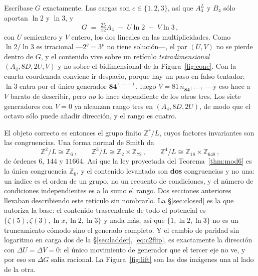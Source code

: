 \documentclass[11pt,a4paper]{article}
\newcommand{\ZZ}{\mathbb{Z}}
\newcommand{\rep}[1]{\mathbf{#1}}
\begin{document}
Escríbase $G$ exactamente. Las cargas son $c\in\{1,2,3\}$, así que $A_4^{L}$ y $B_4$ sólo aportan
$\ln 2$ y $\ln 3$, y
\begin{equation}\label{eq:UV}
  G\;=\;\tfrac{25}{12}A_4\;-\;U\ln 2\;-\;V\ln 3\,,
\end{equation}
con $U$ semientero y $V$ entero, los dos lineales en las multiplicidades. Como $\ln2/\ln3$ es
irracional ---$2^q=3^p$ no tiene solución---, el par $(U,V)$ no se pierde dentro de $G$, y el
contenido vive sobre un retículo \emph{tetradimensional} $(A_4,8D,2U,V)$ y no sobre el bidimensional
de la Figura~\ref{fig:cone}. Con la cuarta coordenada conviene ir despacio, porque hay un paso en
falso tentador: $\ln3$ entra por el único generador $\rep{84}^{(+,-)}$, luego
$V=81\,n_{\rep{84}^{(+,-)}}$ ---y eso hace a $V$ barato de describir, pero \emph{no} lo hace
dependiente de los otros tres. Los siete generadores con $V=0$ ya alcanzan rango tres en
$(A_4,8D,2U)$, de modo que el octavo sólo puede añadir dirección, y el rango es cuatro.

El objeto correcto es entonces el grupo finito $\ZZ^r/L$, cuyos factores invariantes son las
congruencias. Una forma normal de Smith da
\begin{equation}\label{eq:snf}
  \ZZ^2/L\cong\ZZ_6\,,\qquad
  \ZZ^3/L\cong\ZZ_2\times\ZZ_{72}\,,\qquad
  \ZZ^4/L\cong\ZZ_{18}\times\ZZ_{648}\,,
\end{equation}
de órdenes $6$, $144$ y $11664$. Así que la ley proyectada del Teorema~\ref{thm:mod6} es la única
congruencia $\ZZ_6$, y el contenido levantado son \textbf{dos} congruencias y no una: un índice es
el orden de un grupo, no un recuento de condiciones, y el número de condiciones independientes es a
lo sumo el rango. Dos secciones anteriores llevaban describiendo este retículo sin nombrarlo.
La \S\ref{sec:closed} es la que autoriza la base: el contenido trascendente de todo el potencial es
$\{\zeta(5),\zeta(3),\ln x,\ln 2,\ln 3\}$ y nada más, así que $\{1,\ln2,\ln3\}$ no es un
truncamiento cómodo sino el generado completo. Y el cambio de paridad sin logaritmo en carga dos de
la \S\ref{sec:ladder}, \eqref{eq:c2flip}, es exactamente la dirección con $\Delta U=\Delta V=0$: el
único movimiento de generador que el tercer eje no ve, y por eso su $\Delta G$ salía racional. La
Figura~\ref{fig:lift} son las dos imágenes una al lado de la otra.
\end{document}
